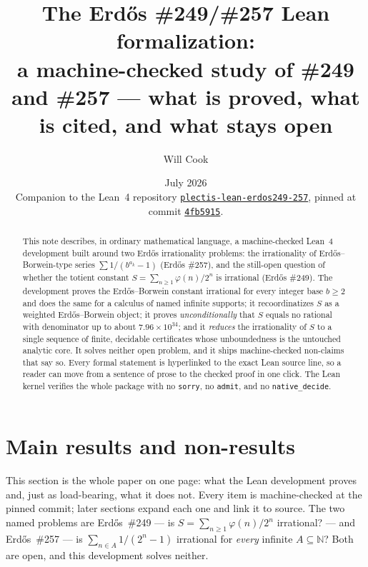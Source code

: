 \documentclass[11pt]{article}
\title{\vspace{-2em}The Erd\H{o}s \#249/\#257 Lean formalization:\\
{\large a machine-checked study of \#249 and \#257 --- what is proved, what is cited, and what stays open}}
\author{Will Cook}
\date{July 2026\\[4pt]
{\footnotesize Companion to the Lean~4 repository
\href{https://github.com/wcook04/plectis-lean-erdos249-257}{\texttt{plectis-lean-erdos249-257}}, pinned at commit \href{\repobase}{\texttt{4fb5915}}.}}
\theoremstyle{definition}
\theoremstyle{remark}
\newcommand{\N}{\mathbb{N}}
\newcommand{\ph}{\varphi}
\begin{document}
\sloppy
\maketitle

\begin{abstract}
\noindent
This note describes, in ordinary mathematical language, a machine-checked
Lean~4 development built around two Erd\H{o}s irrationality problems: the
irrationality of Erd\H{o}s--Borwein-type series $\sum 1/(b^{a_k}-1)$ (Erd\H{o}s
\#257), and the still-open question of whether the totient constant
$S=\sum_{n\ge1}\ph(n)/2^n$ is irrational (Erd\H{o}s \#249). The development
proves the Erd\H{o}s--Borwein constant irrational for every integer base $b\ge2$
and does the same for a calculus of named infinite supports; it recoordinatizes
$S$ as a weighted Erd\H{o}s--Borwein object; it proves \emph{unconditionally}
that $S$ equals no rational with denominator up to about $7.96\times10^{34}$;
and it \emph{reduces} the irrationality of $S$ to a single sequence of finite,
decidable certificates whose unboundedness is the untouched analytic core. It
solves neither open problem, and it ships machine-checked non-claims that say
so. Every formal statement is hyperlinked to the exact Lean source line, so a
reader can move from a sentence of prose to the checked proof in one click. The
Lean kernel verifies the whole package with no \texttt{sorry}, no
\texttt{admit}, and no \texttt{native\_decide}.
\end{abstract}

\tableofcontents

\section{Main results and non-results}\label{sec:main}

This section is the whole paper on one page: what the Lean development proves
and, just as load-bearing, what it does not. Every item is machine-checked at
the pinned commit; later sections expand each one and link it to source. The two
named problems are Erd\H{o}s~\#249 --- is $S=\sum_{n\ge1}\ph(n)/2^n$ irrational?
--- and Erd\H{o}s~\#257 --- is $\sum_{n\in A}1/(2^n-1)$ irrational for
\emph{every} infinite $A\subseteq\N$? Both are open, and this development solves
neither.
\end{document}
